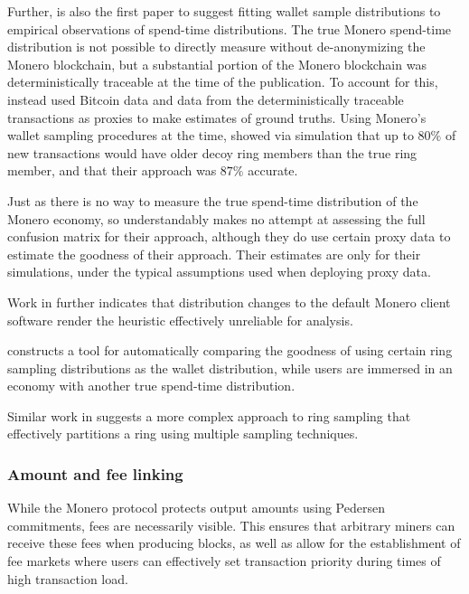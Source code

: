 \documentclass{article}
\theoremstyle{definition}
\begin{document}
Further, \cite{moser2017empirical} is also the first paper to suggest fitting wallet sample distributions to empirical observations of spend-time distributions.
The true Monero spend-time distribution is not possible to directly measure without de-anonymizing the Monero blockchain, but a substantial portion of the Monero blockchain was deterministically traceable at the time of the publication.
To account for this, \cite{moser2017empirical} instead used Bitcoin data and data from the deterministically traceable transactions as proxies to make estimates of ground truths.
Using Monero's wallet sampling procedures at the time, \cite{moser2017empirical} showed via simulation that up to $80\%$ of new transactions would have older decoy ring members than the true ring member, and that their approach was $87\%$ accurate.

Just as there is no way to measure the true spend-time distribution of the Monero economy, so \cite{moser2017empirical} understandably makes no attempt at assessing the full confusion matrix for their approach, although they do use certain proxy data to estimate the goodness of their approach.
Their estimates are only for their simulations, under the typical assumptions used when deploying proxy data.

Work in \cite{hinteregger2018monero} further indicates that distribution changes to the default Monero client software render the heuristic effectively unreliable for analysis.

\cite{ronge2021foundations} constructs a tool for automatically comparing the goodness of using certain ring sampling distributions as the wallet distribution, while users are immersed in an economy with another true spend-time distribution.

Similar work in \cite{christensen2018comparative} suggests a more complex approach to ring sampling that effectively partitions a ring using multiple sampling techniques.


\subsubsection{Amount and fee linking}

While the Monero protocol protects output amounts using Pedersen commitments, fees are necessarily visible.
This ensures that arbitrary miners can receive these fees when producing blocks, as well as allow for the establishment of fee markets where users can effectively set transaction priority during times of high transaction load.
\end{document}
